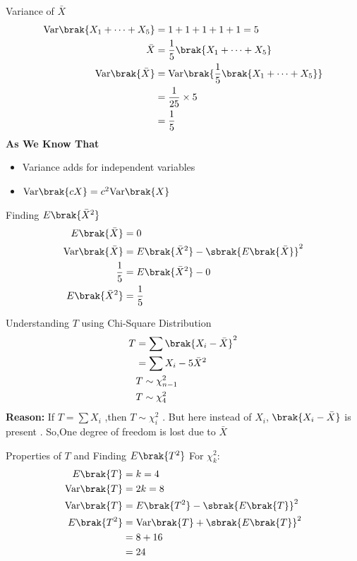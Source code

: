 \documentclass{beamer}
\begin{document}
\begin{frame}{Variance of $\bar{X}$}
\begin{align}
\text{Var}\brak{X_1 + \cdots + X_5} &= 1+1+1+1+1 = 5\\
\bar{X} &= \frac{1}{5}\brak{X_1 + \cdots + X_5}\\
\text{Var}\brak{\bar{X}} &= \text{Var}\brak{\frac{1}{5}\brak{X_1 + \cdots + X_5}} \\
 &=\frac{1}{25} \times 5 \\
 &= \frac{1}{5}
\\
\end{align}
\textbf{As We Know That}
\begin{itemize}
\item Variance adds for independent variables
\item $\text{Var}\brak{cX} = c^2 \text{Var}\brak{X}$
\end{itemize}
\end{frame}

\begin{frame}{Finding $E\brak{\bar{X}^2}$}
\begin{align}
E\brak{\bar{X}} &= 0 \\
\text{Var}\brak{\bar{X}} &= E\brak{\bar{X}^2} - \sbrak{E\brak{\bar{X}}}^2 \\
\frac{1}{5} &= E\brak{\bar{X}^2} - 0   \\
E\brak{\bar{X}^2} &= \frac{1}{5}
\end{align}
\end{frame}

\begin{frame}{Understanding $T$ using Chi-Square Distribution}
\begin{align}
T &= \sum \brak{X_i - \bar{X}}^2 \\
&= \sum X_i -5\bar{X}^2 \\
&T \sim \chi^2_{n-1}\\
&T \sim\chi^2_4
\end{align}
\textbf{Reason:}
If $T= \sum X_i$ ,then $T \sim \chi^2_i$ .
But here instead of $X_i$, $\brak{X_i-\bar{X}}$ is present .
So,One degree of freedom is lost due to $\bar{X}$
\end{frame}

\begin{frame}{Properties of $T$ and Finding $E\brak{T^2}$}
For $\chi^2_k$:
\begin{align}
E\brak{T} &= k = 4  \\
\text{Var}\brak{T} &= 2k = 8 \\
\text{Var}\brak{T} &= E\brak{T^2} - \sbrak{E\brak{T}}^2 \\
E\brak{T^2} &= \text{Var}\brak{T} + \sbrak{E\brak{T}}^2 \\
&= 8 + 16 \\
&= 24
\end{align}
\end{frame}
\end{document}
